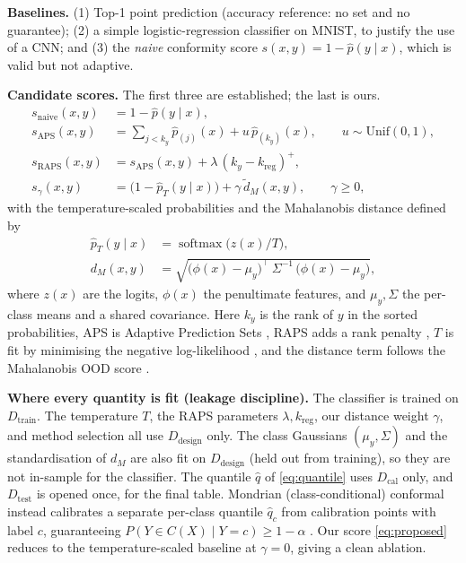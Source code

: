 \documentclass{article}
\begin{document}
\textbf{Baselines.} (1) Top-1 point prediction (accuracy reference: no set and no guarantee);
(2) a simple logistic-regression classifier on MNIST, to justify the use of a CNN; and (3) the
\emph{naive} conformity score $s(x,y)=1-\hat p(y\mid x)$, which is valid but not adaptive.

\textbf{Candidate scores.} The first three are established; the last is ours.
\begin{align}
  s_{\text{naive}}(x,y)   &= 1-\hat p(y\mid x), \label{eq:naive}\\[2pt]
  s_{\text{APS}}(x,y)     &= \sum_{j<k_y}\hat p_{(j)}(x)+u\,\hat p_{(k_y)}(x),
                             \qquad u\sim\mathrm{Unif}(0,1), \label{eq:aps}\\[2pt]
  s_{\text{RAPS}}(x,y)    &= s_{\text{APS}}(x,y)+\lambda\,(k_y-k_{\text{reg}})^{+},
                             \label{eq:raps}\\[2pt]
  s_\gamma(x,y)           &= \big(1-\hat p_T(y\mid x)\big)+\gamma\,\tilde d_M(x,y),
                             \qquad \gamma\ge 0, \label{eq:proposed}
\end{align}
with the temperature-scaled probabilities and the Mahalanobis distance defined by
\begin{align}
  \hat p_T(y\mid x) &= \operatorname{softmax}\!\big(z(x)/T\big), \label{eq:temp}\\[2pt]
  d_M(x,y)          &= \sqrt{\big(\phi(x)-\mu_y\big)^{\!\top}\,\Sigma^{-1}\,\big(\phi(x)-\mu_y\big)},
                       \label{eq:maha}
\end{align}
where $z(x)$ are the logits, $\phi(x)$ the penultimate features, and $\mu_y,\Sigma$ the per-class
means and a shared covariance. Here $k_y$ is the rank of $y$ in the sorted probabilities, APS is
Adaptive Prediction Sets \citep{romano2020classification}, RAPS adds a rank penalty
\citep{angelopoulos2021learn}, $T$ is fit by minimising the negative log-likelihood
\citep{guo2017calibration}, and the distance term follows the Mahalanobis OOD score
\citep{lee2018simple}.

\textbf{Where every quantity is fit (leakage discipline).} The classifier is trained on
$D_{\text{train}}$. The temperature $T$, the RAPS parameters $\lambda,k_{\text{reg}}$, our distance
weight $\gamma$, and method selection all use $D_{\text{design}}$ only. The class Gaussians
$(\mu_y,\Sigma)$ and the standardisation of $d_M$ are also fit on $D_{\text{design}}$ (held out from
training), so they are not in-sample for the classifier. The quantile $\hat q$ of \eqref{eq:quantile}
uses $D_{\text{cal}}$ only, and $D_{\text{test}}$ is opened once, for the final table. Mondrian
(class-conditional) conformal instead calibrates a separate per-class quantile $\hat q_c$ from
calibration points with label $c$, guaranteeing $P(Y\in C(X)\mid Y=c)\ge 1-\alpha$
\citep{vovk2012conditional}. Our score \eqref{eq:proposed} reduces to the temperature-scaled baseline
at $\gamma=0$, giving a clean ablation.
\end{document}
